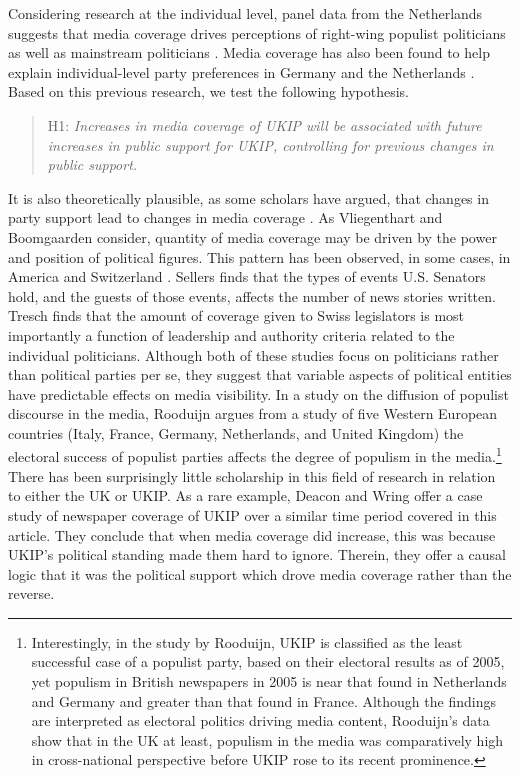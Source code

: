 \documentclass[12pt,]{article}
\begin{document}
Considering research at the individual level, panel data from the
Netherlands suggests that media coverage drives perceptions of
right-wing populist politicians as well as mainstream politicians
\citep{Bos:2011iy}. Media coverage has also been found to help explain
individual-level party preferences in Germany
\citep{semetko_germanys_1994} and the Netherlands
\citep{oegema_personalization_2009}. Based on this previous research, we
test the following hypothesis.

\begin{quote}
H1: \emph{Increases in media coverage of UKIP will be associated with
future increases in public support for UKIP, controlling for previous
changes in public support.}
\end{quote}

It is also theoretically plausible, as some scholars have argued, that
changes in party support lead to changes in media coverage
\citep{pauwels_reassessing_2010}. As Vliegenthart and Boomgaarden
\citeyearpar{vliegenthart_why_2010} consider, quantity of media coverage
may be driven by the power and position of political figures. This
pattern has been observed, in some cases, in America
\citep{sellers_winning_2007} and Switzerland
\citep{tresch_politicians_2009}. Sellers
\citeyearpar{sellers_winning_2007} finds that the types of events U.S.
Senators hold, and the guests of those events, affects the number of
news stories written. Tresch \citeyearpar{tresch_politicians_2009} finds
that the amount of coverage given to Swiss legislators is most
importantly a function of leadership and authority criteria related to
the individual politicians. Although both of these studies focus on
politicians rather than political parties per se, they suggest that
variable aspects of political entities have predictable effects on media
visibility. In a study on the diffusion of populist discourse in the
media, Rooduijn \citeyearpar{rooduijn_mesmerising_2014} argues from a
study of five Western European countries (Italy, France, Germany,
Netherlands, and United Kingdom) the electoral success of populist
parties affects the degree of populism in the
media.\footnote{Interestingly, in the study by Rooduijn, UKIP is classified as the least successful case of a populist party, based on their electoral results as of 2005, yet populism in British newspapers in 2005 is near that found in Netherlands and Germany and greater than that found in France. Although the findings are interpreted as electoral politics driving media content, Rooduijn's data show that in the UK at least, populism in the media was comparatively high in cross-national perspective before UKIP rose to its recent prominence.}
There has been surprisingly little scholarship in this field of research
in relation to either the UK or UKIP. As a rare example, Deacon and
Wring \citeyearpar{deacon_uk_2015} offer a case study of newspaper
coverage of UKIP over a similar time period covered in this article.
They conclude that when media coverage did increase, this was because
UKIP's political standing made them hard to ignore. Therein, they offer
a causal logic that it was the political support which drove media
coverage rather than the reverse.
\end{document}
